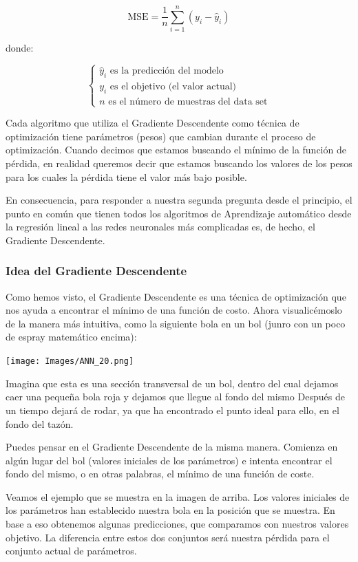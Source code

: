 \documentclass[
]{book}
\begin{document}
\[\textrm{MSE} = \frac{1}{n} \sum_{i=1}^n (y_i - \hat{y}_i)\]

donde:

\[    
\begin{cases}
        \textrm{$\hat{y}_i$ es la predicción del modelo} \\
        \textrm{$y_i$ es el objetivo (el valor actual)} \\
        \textrm{$n$ es el número de muestras del data set}
    \end{cases}
\]

Cada algoritmo que utiliza el Gradiente Descendente como técnica de optimización tiene parámetros (pesos) que cambian durante el proceso de optimización. Cuando decimos que estamos buscando el mínimo de la función de pérdida, en realidad queremos decir que estamos buscando los valores de los pesos para los cuales la pérdida tiene el valor más bajo posible.

En consecuencia, para responder a nuestra segunda pregunta desde el principio, el punto en común que tienen todos los algoritmos de Aprendizaje automático desde la regresión lineal a las redes neuronales más complicadas es, de hecho, el Gradiente Descendente.

\hypertarget{idea-del-gradiente-descendente}{%
\subsubsection{Idea del Gradiente Descendente}\label{idea-del-gradiente-descendente}}

Como hemos visto, el Gradiente Descendente es una técnica de optimización que nos ayuda a encontrar el mínimo de una función de costo. Ahora visualicémoslo de la manera más intuitiva, como la siguiente bola en un bol (junro con un poco de espray matemático encima):

\texttt{[image: Images/ANN\_20.png]}

Imagina que esta es una sección transversal de un bol, dentro del cual dejamos caer una pequeña bola roja y dejamos que llegue al fondo del mismo Después de un tiempo dejará de rodar, ya que ha encontrado el punto ideal para ello, en el fondo del tazón.

Puedes pensar en el Gradiente Descendente de la misma manera. Comienza en algún lugar del bol (valores iniciales de los parámetros) e intenta encontrar el fondo del mismo, o en otras palabras, el mínimo de una función de coste.

Veamos el ejemplo que se muestra en la imagen de arriba. Los valores iniciales de los parámetros han establecido nuestra bola en la posición que se muestra. En base a eso obtenemos algunas predicciones, que comparamos con nuestros valores objetivo. La diferencia entre estos dos conjuntos será nuestra pérdida para el conjunto actual de parámetros.
\end{document}

